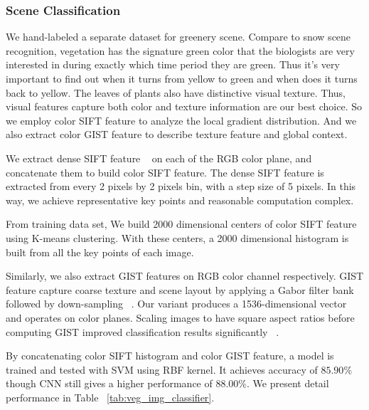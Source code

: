 \subsubsection{Scene Classification}
We hand-labeled a separate dataset for greenery scene.
Compare to snow scene recognition,
vegetation has the signature green color that the  
biologists are very interested in during exactly which time period they are green. 
Thus it's very important 
to find out when it turns from yellow to green and when does it turns back to yellow.
The leaves of plants also have distinctive visual texture. 
Thus, visual features capture both color and texture information are our best choice.
So we employ color SIFT feature to analyze the local gradient distribution. 
And we also extract color GIST feature to describe texture feature and global context. 

We extract dense SIFT feature ~\cite{lowe1999object} on each of the RGB color plane, and concatenate them to 
build color SIFT feature. The dense SIFT feature is extracted from every 2 pixels by 2 pixels bin, 
with a step size of 5 pixels. In this way, we achieve representative key points and reasonable 
computation complex. 

From training data set, We build 2000 dimensional centers of color SIFT feature 
using K-means clustering. With these centers, a 2000 dimensional histogram is built 
from all the key points of each image.

 Similarly, we also extract GIST features on RGB color channel respectively.
GIST feature capture coarse texture
and scene layout by applying a Gabor filter bank followed by
down-sampling ~\cite{oliva2001modeling}. Our variant produces a
1536-dimensional vector and operates on color planes. Scaling
images to have square aspect ratios before computing GIST improved
classification results significantly ~\cite{douze2009evaluation}.

By concatenating color SIFT histogram and color GIST feature, 
a model is trained and tested with SVM using RBF kernel. It achieves accuracy of $85.90\%$ 
though CNN still gives a higher performance of $88.00\%$. We present detail performance in Table 
~\ref{tab:veg_img_classifier}.



